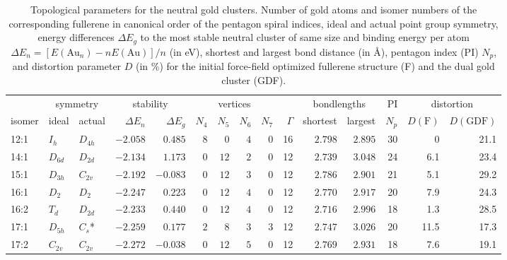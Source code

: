 \begin{table}[ht!]
	\centering
    \setlength{\tabcolsep}{3pt}
    \small{
    \caption{Topological parameters for the neutral gold clusters. Number of
    gold atoms and isomer numbers of the corresponding fullerene in canonical
    order of the pentagon spiral indices,\autocite{Fowler-atlas-2006} ideal and
    actual point group symmetry, energy differences $\Delta E_g$ to the most
    stable neutral cluster of same size and binding energy per atom $\Delta E_n
    = [E(\textrm{Au}_n)-nE(\textrm{Au})]/n$  (in eV), shortest and largest bond
    distance (in \AA), pentagon index (PI) $N_p$, and distortion parameter $D$
    (in \%) for the initial force-field optimized fullerene structure (F) and
    the dual gold cluster (GDF).}
	\label{tab:neutral}
	\begin{tabular}{lllrrrrrrrrrrrr}
\toprule
\multicolumn{1}{c}{  } & \multicolumn{2}{c}{ symmetry  }  & \multicolumn{2}{c}{stability} & \multicolumn{4}{c}{ vertices } & & \multicolumn{2}{c}{ bondlengths } &  PI & \multicolumn{2}{c}{ distortion } \\
isomer & ideal  & actual  & $\Delta E_n$ &$\Delta E_g$ & \multicolumn{1}{c}{$N_4$} & \multicolumn{1}{c}{$N_5$} & \multicolumn{1}{c}{$N_6$} & \multicolumn{1}{c}{$N_7$} & $\Gamma$ & shortest & largest  & $N_p$ & $D(\textrm{F})$ & $D(\textrm{GDF})$\\\midrule
12:1    & $I_h$    & $D_{4h}$ & $-2.058$ & $0.485$  & $8$ & $0$  & $4$      & $0$ & 16 & $2.798$ & $2.895$ & 30  & 0    &  21.1    \\
14:1    & $D_{6d}$ & $D_{2d}$ & $-2.134$ & $1.173$  & $0$ & $12$ & $2$      & $0$ & 12 & $2.739$ & $3.048$ & 24  & 6.1  &  23.4    \\
15:1    & $D_{3h}$ & $C_{2v}$ & $-2.192$ & $-0.083$ & $0$ & $12$ & $3$      & $0$ & 12 & $2.786$ & $2.901$ & 21  & 5.1  &  29.2    \\
16:1    & $D_2$    & $D_{2 }$ & $-2.247$ & $0.223$  & $0$ & $12$ & $4$      & $0$ & 12 & $2.770$ & $2.917$ & 20  & 7.9  &  24.3    \\
16:2    & $T_d$    & $D_{2d}$ & $-2.233$ & $0.440$  & $0$ & $12$ & $4$      & $0$ & 12 & $2.716$ & $2.996$ & 18  & 1.3  &  28.5    \\
17:1    & $D_{5h}$ & $C_s$*   & $-2.259$ & $0.177$  & $2$ & $8$  & $3$      & $3$ & 12 & $2.747$ & $3.026$ & 20  & 11.5 &  17.3    \\
17:2    & $C_{2v}$ & $C_{2v}$ & $-2.272$ & $-0.038$ & $0$ & $12$ & $5$      & $0$ & 12 & $2.769$ & $2.931$ & 18  & 7.6  &  19.1    \\

\end{tabular}}
\end{table}
